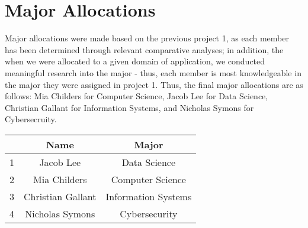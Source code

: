 
\section{\textbf{Major Allocations}}

Major allocations were made based on the previous project 1, as each member has been determined through relevant comparative analyses; in addition, the when we were allocated to a given domain of application, we conducted meaningful research into the major - thus, each member is most knowledgeable in the major they were assigned in project 1. Thus, the final major allocations are as follows: Mia Childers for Computer Science, Jacob Lee for Data Science, Christian Gallant for Information Systems, and Nicholas Symons for Cybersecruity. 

\begin{center}
    \begin{tabular}{ |c|c|c| }
        \hline
        & Name & Major \\
      \hline
      1 & Jacob Lee & Data Science\\
      \hline
      2 & Mia Childers & Computer Science\\
      \hline
      3 & Christian Gallant & Information Systems\\
      \hline
      4 & Nicholas Symons & Cybersecurity\\
      \hline
    \end{tabular}
    \end{center}